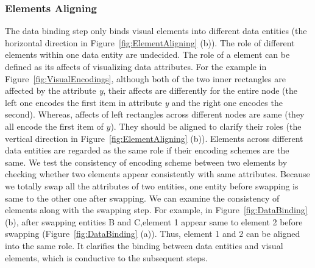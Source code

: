 \subsubsection{Elements Aligning}
The data binding step only binds visual elements into different data entities (the horizontal direction in Figure~\ref{fig:ElementAligning} (b)).
The role of different elements within one data entity are undecided.
The role of a element can be defined as its affects of visualizing data attributes.
For the example in Figure~\ref{fig:VisualEncodings}, although both of the two inner rectangles are affected by the attribute \textit{y}, their affects are differently for the entire node (the left one encodes the first item in attribute \textit{y} and the right one encodes the second).
Whereas, affects of left rectangles across different nodes are same (they all encode the first item of $y$).
They should be aligned to clarify their roles (the vertical direction in Figure~\ref{fig:ElementAligning} (b)).
Elements across different data entities are regarded as the same role if their encoding schemes are the same.
We test the consistency of encoding scheme between two elements by checking whether two elements appear consistently with same attributes.
Because we totally swap all the attributes of two entities, one entity before swapping is same to the other one after swapping.
We can examine the consistency of elements along with the swapping step.
For example, in Figure~\ref{fig:DataBinding} (b), after swapping entities B and C,element 1 appear same to element 2 before swapping (Figure~\ref{fig:DataBinding} (a)). Thus, element 1 and 2 can be aligned into the same role.
It clarifies the binding between data entities and visual elements, which is conductive to the subsequent steps.



